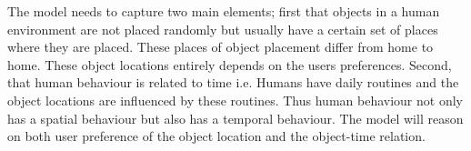 The model needs to capture two main
elements; first that objects in a human environment are not placed randomly but
usually have a certain set of places where they are placed.
These places of object placement differ from home
to home. These object locations entirely depends on the users preferences.  
Second, that human behaviour is related to time i.e. Humans have daily routines  and the object locations are influenced by these routines.
Thus human behaviour not only  has a spatial behaviour but also has a temporal behaviour.
The model will reason on both user preference of the object location and the
object-time relation.



